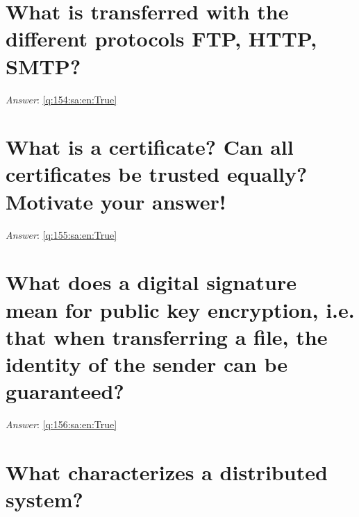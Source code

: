 \documentclass[a4paper,11pt,oneside]{book}
\begin{document}
\begin{sloppypar}
\section{What is transferred with the different protocols FTP, HTTP, SMTP?}

\label{q:154:sa:en:False}

\vspace{2cm}

\noindent\makebox[\textwidth]{\hrulefill}

\vspace{1cm}

\textit{Answer}: \autoref{q:154:sa:en:True}



\section{What is a certificate? Can all certificates be trusted equally? Motivate your answer!}

\label{q:155:sa:en:False}

\vspace{2cm}

\noindent\makebox[\textwidth]{\hrulefill}

\vspace{1cm}

\textit{Answer}: \autoref{q:155:sa:en:True}



\section{What does a digital signature mean for public key encryption, i.e. that when transferring a file, the identity of the sender can be guaranteed?}

\label{q:156:sa:en:False}

\vspace{2cm}

\noindent\makebox[\textwidth]{\hrulefill}

\vspace{1cm}

\textit{Answer}: \autoref{q:156:sa:en:True}



\section{What characterizes a distributed system?}

\label{q:157:sa:en:False}


\end{sloppypar}
\end{document}
